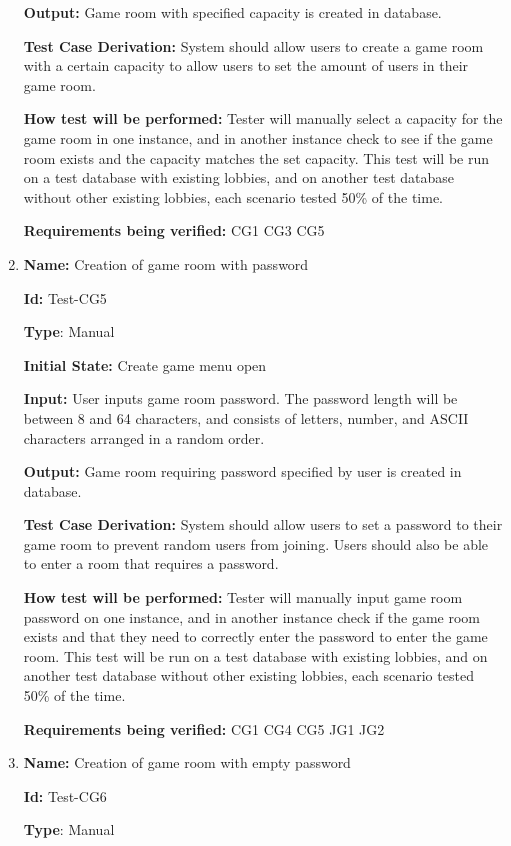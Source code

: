 \documentclass[12pt, titlepage]{article}
\begin{document}
\begin{enumerate}
\textbf{Output:} Game room with specified capacity is created in database.

\textbf{Test Case Derivation:} System should allow users to create a game room with a certain capacity to allow users to set the amount of users in their game room.

\textbf{How test will be performed:} Tester will manually select a capacity for the game room in one instance, and in another instance check to see if the game room exists and the capacity matches the set capacity. This test will be run on a test database with existing lobbies, and on another test database without other existing lobbies, each scenario tested 50\% of the time.

\textbf{Requirements being verified: }CG1 CG3 CG5

\item{\textbf{Name:} Creation of game room with password} \label{itm:Test-CG5}

\textbf{Id:} Test-CG5

\textbf{Type}: Manual

\textbf{Initial State:} Create game menu open

\textbf{Input:} User inputs game room password. The password length will be between 8 and 64 characters, and consists of letters, number, and ASCII characters arranged in a random order. 

\textbf{Output:} Game room requiring password specified by user is created in database.

\textbf{Test Case Derivation:} System should allow users to set a password to their game room to prevent random users from joining. Users should also be able to enter a room that requires a password.

\textbf{How test will be performed:} Tester will manually input game room password on one instance, and in another instance check if the game room exists and that they need to correctly enter the password to enter the game room. This test will be run on a test database with existing lobbies, and on another test database without other existing lobbies, each scenario tested 50\% of the time.

\textbf{Requirements being verified: }CG1 CG4 CG5 JG1 JG2

\item{\textbf{Name:} Creation of game room with empty password} \label{itm:Test-CG6}

\textbf{Id:} Test-CG6

\textbf{Type}: Manual


\end{enumerate}
\end{document}
